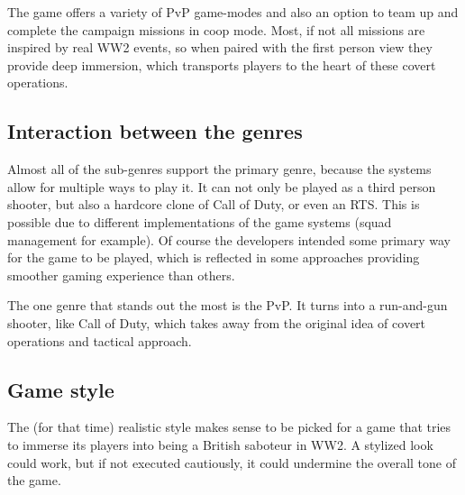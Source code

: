 \documentclass[a4paper,10pt,english]{article}
\begin{document}
The game offers a variety of PvP game-modes and also an option to team up and complete the campaign missions in coop mode. Most, if not all missions are inspired by real WW2 events, so when paired with the first person view they provide deep immersion, which transports players to the heart of these covert operations.
\subsection*{Interaction between the genres}
Almost all of the sub-genres support the primary genre, because the systems allow for multiple ways to play it. It can not only be played as a third person shooter, but also a hardcore clone of Call of Duty, or even an RTS. This is possible due to different implementations of the game systems (squad management for example). Of course the developers intended some primary way for the game to be played, which is reflected in some approaches providing smoother gaming experience than others. 

The one genre that stands out the most is the PvP. It turns into a run-and-gun shooter, like Call of Duty, which takes away from the original idea of covert operations and tactical approach.

\subsection*{Game style}
The (for that time) realistic style makes sense to be picked for a game that tries to immerse its players into being a British saboteur in WW2. A stylized look could work, but if not executed cautiously, it could undermine the overall tone of the game.
\end{document}
